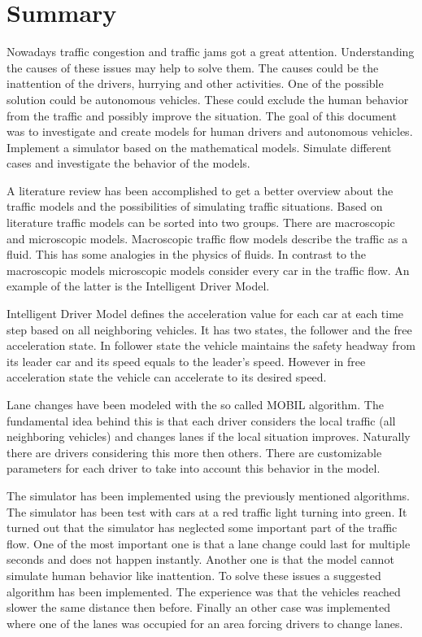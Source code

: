 \chapter*{Summary}
Nowadays traffic congestion and traffic jams got a great attention. Understanding the causes of these issues may help to solve them. The causes could be the inattention of the drivers, hurrying and other activities. One of the possible solution could be autonomous vehicles. These could exclude the human behavior from the traffic and possibly improve the situation. The goal of this document was to investigate and create models for human drivers and autonomous vehicles. Implement a simulator based on the mathematical models. Simulate different cases and investigate the behavior of the models.

A literature review has been accomplished to get a better overview about the traffic models and the possibilities of simulating traffic situations. Based on literature traffic models can be sorted into two groups. There are macroscopic and microscopic models. Macroscopic traffic flow models describe the traffic as a fluid. This has some analogies in the physics of fluids. In contrast to the macroscopic models microscopic models consider every car in the traffic flow. An example of the latter is the Intelligent Driver Model.

Intelligent Driver Model defines the acceleration value for each car at each time step based on all neighboring vehicles. It has two states, the follower and the free acceleration state. In follower state the vehicle maintains the safety headway from its leader car and its speed equals to the leader's speed. However in free acceleration state the vehicle can accelerate to its desired speed.

Lane changes have been modeled with the so called MOBIL algorithm. The fundamental idea behind this is that each driver considers the local traffic (all neighboring vehicles) and changes lanes if the local situation improves. Naturally there are drivers considering this more then others. There are customizable parameters for each driver to take into account this behavior in the model.

The simulator has been implemented using the previously mentioned algorithms. The simulator has been test with cars at a red traffic light turning into green. It turned out that the simulator has neglected some important part of the traffic flow. One of the most important one is that a lane change could last for multiple seconds and does not happen instantly. Another one is that the model cannot simulate human behavior like inattention. To solve these issues a suggested algorithm has been implemented. The experience was that the vehicles reached slower the same distance then before. Finally an other case was implemented where one of the lanes was occupied for an area forcing drivers to change lanes.

